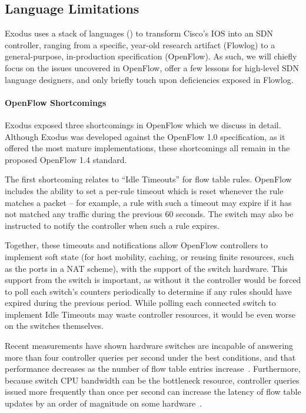 \subsection{Language Limitations}

Exodus uses a stack of languages (\cf {}) to transform Cisco's IOS into
an SDN controller, ranging from a specific, year-old research artifact (Flowlog) to
a general-purpose, in-production specification (OpenFlow). As such, we will chiefly focus on the
issues uncovered in OpenFlow, offer a few lessons for high-level SDN language designers,
and only briefly touch upon deficiencies exposed in Flowlog.

\paragraph{OpenFlow Shortcomings}

Exodus exposed three shortcomings in OpenFlow which we discuss in detail.
Although Exodus was developed against the OpenFlow 1.0 specification, as it
offered the most mature implementations, these shortcomings all remain in the
proposed OpenFlow 1.4 standard.

The first shortcoming relates to ``Idle Timeouts'' for flow table rules.
OpenFlow includes the ability to set a per-rule timeout which is reset whenever
the rule matches a packet -- for example, a rule with such a timeout may
expire if it has not matched any traffic during the previous 60 seconds.
The switch may also be instructed to notify the controller when such a
rule expires.

Together, these timeouts and notifications allow OpenFlow controllers to
implement soft state (for host mobility, caching, or reusing finite resources, such
as the ports in a NAT scheme), with the support of the switch hardware.
This support from the switch is important, as without it the controller would
be forced to poll each switch's counters periodically to determine if any rules
should have expired during the previous period.
While polling each connected switch to implement Idle Timeouts may
waste controller resources, it would be even worse on the switches themselves.

Recent measurements have shown hardware switches are
incapable of answering more than four controller queries per second under
the best conditions, and that performance decreases as the number of flow table
entries increase~\cite{Curtis:2011devoflow,Rotsos:2012oflops}.
Furthermore, because switch CPU bandwidth can be the bottleneck resource,
controller queries issued more frequently than once per second can increase the
latency of flow table updates by an order of magnitude on some hardware~\cite{Rotsos:2012oflops}.


